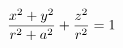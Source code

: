 \documentclass[preview]{standalone}
\begin{document}
\begin{align*}
\special{dvisvgm:raw <g id='unique000'>}\frac{x^2+y^2}{r^2+a^2} + \frac{z^2}{r^2} = 1\special{dvisvgm:raw </g>}
\end{align*}
\end{document}
